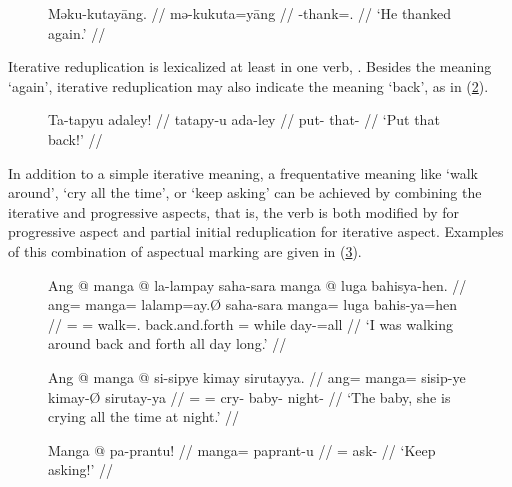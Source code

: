 \begin{figure}[h]
\pex\label{ex:preford}
\a\begingl
	\gla Məku-kutayāng. //
	\glb mə-ku\til{}kuta=yāng //
	\glc \Pst{}-\Iter{}\til{}thank=\TsgM{}.\Aarg{} //
	\glft `He thanked again.' //
\endgl

\a\ljudge* {}
\xe
\end{figure}

Iterative reduplication is lexicalized at least in one verb, 
. Besides the meaning `again', iterative
reduplication may also indicate the meaning `back', as in (\ref{ex:backiter}).

\begin{figure}[h]
\ex\label{ex:backiter}\begingl
	\gla Ta-tapyu adaley! //
	\glb ta\til{}tapy-u ada-ley //
	\glc \Iter{}\til{}put-\Imp{} that-\PargI{} //
	\glft `Put that back!' //
\endgl\xe
\end{figure}

In addition to a simple iterative meaning, a frequentative meaning like `walk 
around', `cry all the time', or `keep asking' can be achieved by combining the 
iterative and progressive aspects, that is, the verb is both modified by 
 for progressive aspect and partial initial reduplication for 
iterative aspect. Examples of this combination of aspectual marking are given
in (\ref{ex:progiter}).

\begin{figure}[h]
\pex\label{ex:progiter}
\a\begingl
	\gla Ang @ manga @ la-lampay saha-sara manga @ luga bahisya-hen. //
	\glb ang= manga= la\til{}lamp=ay.Ø saha-sara manga= luga bahis-ya=hen //
	\glc \AgtT{}= \Prog{}= \Iter{}\til{}walk=\Fsg{}.\Top{} back.and.forth 
		\Dir{}= while day-\Loc{}=all //
	\glft `I was walking around back and forth all day long.' //
\endgl

\a\begingl
	\gla Ang @ manga @ si-sipye kimay sirutayya. //
	\glb ang= manga= si\til{}sip-ye kimay-Ø sirutay-ya //
	\glc \AgtT{}= \Prog{}= \Iter{}\til{}cry-\TsgF{} baby-\Top{} 
		night-\Loc{} //
	\glft `The baby, she is crying all the time at night.' //
\endgl

\a\begingl
	\gla Manga @ pa-prantu! //
	\glb manga= pa\til{}prant-u //
	\glc \Prog{}= \Iter{}\til{}ask-\Imp{} //
	\glft `Keep asking!' //
\endgl
\xe
\end{figure}


